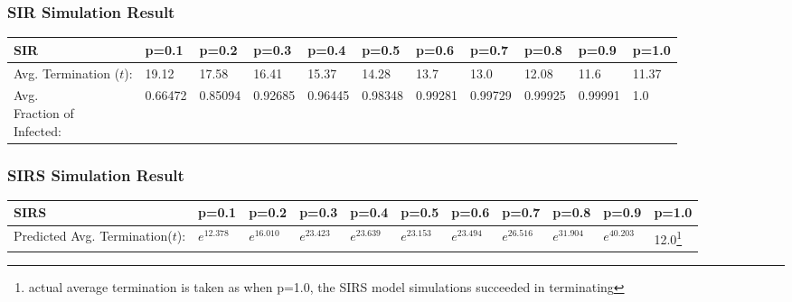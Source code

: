 \documentclass{subfile}
\begin{document}
  \subsubsection{SIR Simulation Result}
  \begin{tabular}{|l|l|l|l|l|l|l|l|l|l|l|}
    \hline
    SIR & p=0.1 & p=0.2 & p=0.3 & p=0.4 & p=0.5 & p=0.6 & p=0.7 & p=0.8 & p=0.9 & p=1.0\\
    \hline
    \makecell{Avg.\\Termination\\(\(t\)):} & 19.12 & 17.58 & 16.41 & 15.37 & 14.28 & 13.7 & 13.0 & 12.08 & 11.6 & 11.37\\
    \hline
    \makecell{Avg.\\Fraction of\\ Infected:} & 0.66472 & 0.85094 & 0.92685 & 0.96445 & 0.98348 & 0.99281 & 0.99729 & 0.99925 & 0.99991 & 1.0\\
    \hline
  \end{tabular}

  \subsubsection{SIRS Simulation Result}
  \begin{tabular}{|l|l|l|l|l|l|l|l|l|l|l|}
    \hline
    SIRS & p=0.1 & p=0.2 & p=0.3 & p=0.4 & p=0.5 & p=0.6 & p=0.7 & p=0.8 & p=0.9 & p=1.0\\
    \hline
    \makecell{Predicted Avg.\\ Termination(\(t\))}: & \(e^{12.378}\) & \(e^{16.010}\) & \(e^{23.423}\) & \(e^{23.639}\) & \(e^{23.153}\) & \(e^{23.494}\) & \(e^{26.516}\) & \(e^{31.904}\) & \(e^{40.203}\) & 12.0\footnote{actual average termination is taken as when p=1.0, the SIRS model simulations succeeded in terminating}\\
    \hline
  \end{tabular}
\end{document}
